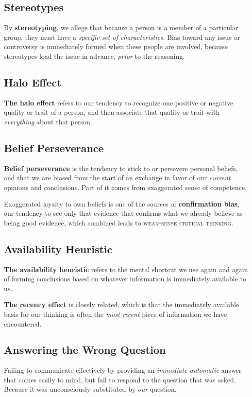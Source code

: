 \documentclass{article}
\begin{document}
\subsection{Stereotypes}
By \textbf{stereotyping}, we allege that because a person is a member of a particular group, they must have a \emph{specific set of characteristics}. Bias toward any issue or controversy is immediately formed when these people are involved, because stereotypes load the issue in advance, \emph{prior} to the reasoning.

\subsection{Halo Effect}
\textbf{The halo effect} refers to our tendency to recognize one positive or negative quality or trait of a person, and then associate that quality or trait with \emph{everything} about that person.

\subsection{Belief Perseverance}
\textbf{Belief perseverance} is the tendency to stick to or persevere personal beliefs, and that we are biased from the start of an exchange in favor of our \emph{current} opinions and conclusions. Part of it comes from exaggerated sense of competence.

Exaggerated loyalty to own beliefs is one of the sources of \textbf{confirmation bias}, our tendency to see only that evidence that confirms what we already believe as being good evidence, which combined leads to \textsc{weak-sense critical thinking}.

\subsection{Availability Heuristic}
\textbf{The availability heuristic} refers to the mental shortcut we use again and again of forming conclusions based on whatever information is immediately available to us.

\textbf{The recency effect} is closely related, which is that the immediately available basis for our thinking is often the \emph{most recent} piece of information we have encountered.

\subsection{Answering the Wrong Question}
Failing to communicate effectively by providing an \emph{immediate automatic} answer that comes easily to mind, but fail to respond to the question that was asked. Because it was unconsciously substituted by \emph{our} question.
\end{document}
